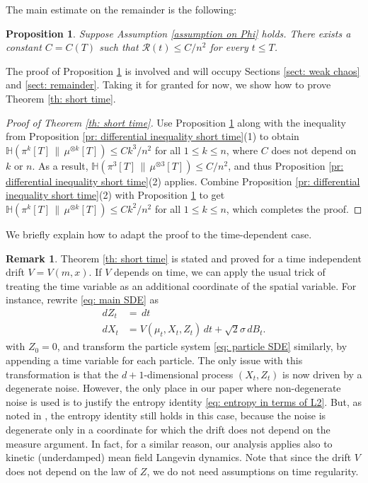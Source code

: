 \documentclass[11pt,reqno]{amsart}
\numberwithin{equation}{section}
\newtheorem{proposition}[theorem]{Proposition}
\theoremstyle{definition}
\newtheorem{remark}[theorem]{Remark}
\newcommand{\ent}{ \mathbb H}
\begin{document}
The main estimate on the remainder is the following:
\begin{proposition}
\label{pr: estimating remainder}
Suppose Assumption \ref{assumption on Phi} holds.
There exists a constant $C=C(T)$ such that $\mathcal R(t) \le C/n^2$ for every $t\leq T$.
\end{proposition}

The proof of Proposition \ref{pr: estimating remainder} is involved and will occupy Sections \ref{sect: weak chaos} and \ref{sect: remainder}. Taking it for granted for now, we show how to prove Theorem \ref{th: short time}.

\begin{proof}[Proof of Theorem \ref{th: short time}]
    Use Proposition \ref{pr: estimating remainder} along with the inequality from Proposition \ref{pr: differential inequality short time}(1) to obtain  $\ent (\pi^k[T]\,\|\,\mu^{\otimes k}[T]) \leq Ck^3/n^2$ for all $1 \le k \le n$, 
    where $C$ does not depend on $k$ or $n$. As a result, $\ent (\pi^3[T]\,\|\,\mu^{\otimes 3}[T])\leq C/n^2$, and thus Proposition \ref{pr: differential inequality short time}(2) applies. Combine Proposition \ref{pr: differential inequality short time}(2) with Proposition \ref{pr: estimating remainder} to get  $\ent (\pi^k[T]\,\|\,\mu^{\otimes k}[T]) \leq Ck^2/n^2$ for all $1 \le k \le n$, which completes the proof.
\end{proof}

We briefly explain how to adapt the proof to the time-dependent case.
\begin{remark}
    \label{rk: time dependent setting} Theorem \ref{th: short time} is stated and proved for a time independent drift $ V=V(m,x)$. If $ V$ depends on time, we can apply the usual trick of treating the time variable as an additional coordinate of the spatial variable. For instance, rewrite \eqref{eq: main SDE} as
    \begin{align*}
        dZ_t&=\,dt\\
        dX_t&=  V(\mu_t,X_t,Z_t)\,dt+\sqrt 2 \sigma\,dB_t.
    \end{align*}
    with $Z_0=0$, and transform the particle system \eqref{eq: particle SDE} similarly, by appending a time variable for each particle. The only issue with this transformation is that the $d+1$-dimensional process $(X_t,Z_t)$ is now driven by a degenerate noise. However, the only place in our paper where non-degenerate noise is used is to justify the entropy identity  \eqref{eq: entropy in terms of L2}. But, as noted in \cite[Remark 4.5]{HierarchiesPaper}, the entropy identity still holds in this case, because the noise is degenerate only in a coordinate for which the drift does not depend on the measure argument. In fact, for a similar reason, our analysis applies also to kinetic (underdamped) mean field Langevin dynamics. Note that since the drift $V$ does not depend on the law of $Z$, we do not need assumptions on time regularity.
\end{remark}
\end{document}
